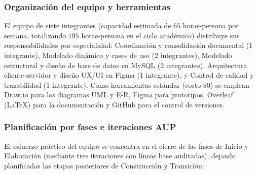 \subsubsection*{Organización del equipo y herramientas}
El equipo de siete integrantes (capacidad estimada de $65$ horas-persona por semana, totalizando $195$ horas-persona en el ciclo académico) distribuye sus responsabilidades por especialidad: Coordinación y consolidación documental (1 integrante), Modelado dinámico y casos de uso (2 integrantes), Modelado estructural y diseño de base de datos en MySQL (2 integrantes), Arquitectura cliente-servidor y diseño UX/UI en Figma (1 integrante), y Control de calidad y trazabilidad (1 integrante). Como herramientas estándar (costo $\$0$) se emplean Draw.io para los diagramas UML y E-R, Figma para prototipos, Overleaf (LaTeX) para la documentación y GitHub para el control de versiones.

\subsubsection*{Planificación por fases e iteraciones AUP}
El esfuerzo práctico del equipo se concentra en el cierre de las fases de Inicio y Elaboración (mediante tres iteraciones con líneas base auditadas), dejando planificadas las etapas posteriores de Construcción y Transición:

